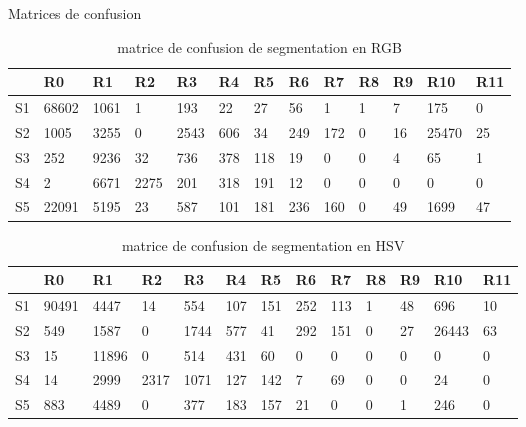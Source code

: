 \documentclass[article=a4, fontsize=11pt]{scrartcl}	%
\begin{document}
\clearpage
\Huge {Matrices de confusion}\normalsize
\begin{table}[!ht]
	\begin{center}
	    \begin{tabular}{| l | l | l | l | l | l | l | l | l | l | l | l | l |  }
	    	\hline
	    	  & R0 & R1 & R2 & R3 & R4 & R5 & R6 & R7 & R8 & R9 & R10 & R11\\
	    	\hline
	    	S1 & 68602 & 1061 & 1 & 193 & 22 & 27 & 56 & 1 & 1 & 7 & 175 & 0 \\
	    	\hline
	    	S2 & 1005 & 3255 & 0 & 2543 & 606 & 34 & 249 & 172 & 0 & 16 & 25470 & 25 \\
	    	\hline
	    	S3 &  252 & 9236 & 32 & 736 & 378 & 118 & 19 & 0 & 0 & 4 & 65 & 1\\
	    	\hline
	    	S4 &  2 & 6671 & 2275 & 201 & 318 & 191 & 12 & 0 & 0 & 0 & 0 & 0\\
	    	\hline
	    	S5 &  22091 & 5195 & 23 & 587 & 101 & 181 & 236 & 160 & 0 & 49 & 1699 & 47 \\
	    	\hline	    	
	    \end{tabular}
	\end{center}
	\caption {matrice de confusion de segmentation en RGB}
\end{table}

\begin{table}[!ht]
	\begin{center}
	    \begin{tabular}{| l | l | l | l | l | l | l | l | l | l | l | l | l |  }
	    	\hline
	    	  & R0 & R1 & R2 & R3 & R4 & R5 & R6 & R7 & R8 & R9 & R10 & R11\\
	    	\hline
	    	S1 & 90491 & 4447 & 14 & 554 & 107 & 151 & 252 & 113 & 1 & 48 & 696 & 10\\
	    	\hline
	    	S2 & 549 & 1587 & 0 & 1744 & 577 & 41 & 292 & 151 & 0 & 27 & 26443 & 63\\
	    	\hline
	    	S3 & 15 & 11896 & 0 & 514 & 431 & 60 & 0 & 0 & 0 & 0 & 0 & 0\\
	    	\hline
	    	S4 & 14 & 2999 & 2317 & 1071 & 127 & 142 & 7 & 69 & 0 & 0 & 24 & 0\\
	    	\hline
	    	S5 & 883 & 4489 & 0 & 377 & 183 & 157 & 21 & 0 & 0 & 1 & 246 & 0\\
	    	\hline	    	
	    \end{tabular}
	\end{center}
	\caption {matrice de confusion de segmentation en HSV}
\end{table}
\end{document}
